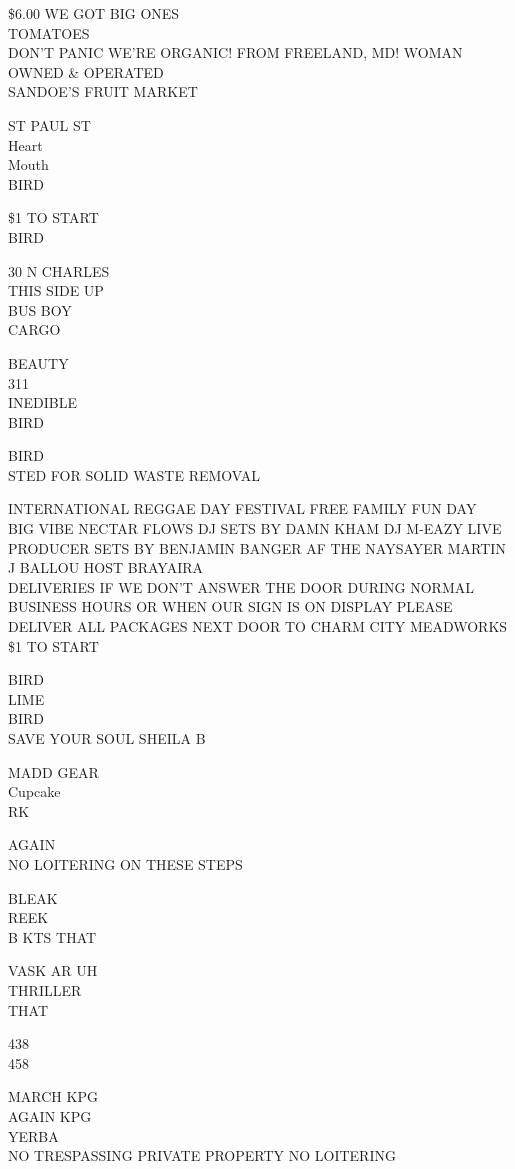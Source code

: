 \documentclass[10pt,letterpaper]{article}
\begin{document}
\$6.00 WE GOT BIG ONES\\
TOMATOES\\
DON'T PANIC WE'RE ORGANIC!  FROM FREELAND, MD!  WOMAN OWNED \& OPERATED\\
SANDOE'S FRUIT MARKET

ST PAUL ST\\
Heart\\
Mouth\\
BIRD

\$1 TO START\\
BIRD

30 N CHARLES\\
THIS SIDE UP\\
BUS BOY\\
CARGO

BEAUTY\\
311\\
INEDIBLE\\
BIRD

BIRD\\
STED FOR SOLID WASTE REMOVAL

INTERNATIONAL REGGAE DAY FESTIVAL FREE FAMILY FUN DAY\\
BIG VIBE NECTAR FLOWS DJ SETS BY DAMN KHAM DJ M{-}EAZY LIVE PRODUCER SETS BY BENJAMIN BANGER AF THE NAYSAYER MARTIN J BALLOU HOST BRAYAIRA\\
DELIVERIES IF WE DON'T ANSWER THE DOOR DURING NORMAL BUSINESS HOURS OR WHEN OUR SIGN IS ON DISPLAY PLEASE DELIVER ALL PACKAGES NEXT DOOR TO CHARM CITY MEADWORKS\\
\$1 TO START

BIRD\\
LIME\\
BIRD\\
SAVE YOUR SOUL SHEILA B

MADD GEAR\\
Cupcake\\
RK

AGAIN\\
NO LOITERING ON THESE STEPS

BLEAK\\
REEK\\
B KTS THAT

VASK AR UH\\
THRILLER\\
THAT

438\\
458

MARCH KPG\\
AGAIN KPG\\
YERBA\\
NO TRESPASSING PRIVATE PROPERTY NO LOITERING
\end{document}
